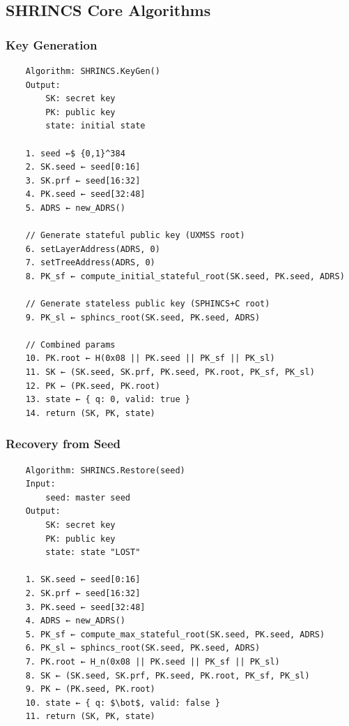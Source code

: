 \subsection{SHRINCS Core Algorithms}

\subsubsection{Key Generation}

\begin{verbatim}
    Algorithm: SHRINCS.KeyGen()
    Output:
        SK: secret key
        PK: public key  
        state: initial state

    1. seed ←$ {0,1}^384
    2. SK.seed ← seed[0:16]
    3. SK.prf ← seed[16:32]
    4. PK.seed ← seed[32:48]
    5. ADRS ← new_ADRS()

    // Generate stateful public key (UXMSS root)
    6. setLayerAddress(ADRS, 0)
    7. setTreeAddress(ADRS, 0)
    8. PK_sf ← compute_initial_stateful_root(SK.seed, PK.seed, ADRS)

    // Generate stateless public key (SPHINCS+C root)
    9. PK_sl ← sphincs_root(SK.seed, PK.seed, ADRS)

    // Combined params
    10. PK.root ← H(0x08 || PK.seed || PK_sf || PK_sl)
    11. SK ← (SK.seed, SK.prf, PK.seed, PK.root, PK_sf, PK_sl)
    12. PK ← (PK.seed, PK.root)
    13. state ← { q: 0, valid: true }
    14. return (SK, PK, state)
\end{verbatim}

\subsubsection{Recovery from Seed}

\begin{verbatim}
    Algorithm: SHRINCS.Restore(seed)
    Input:
        seed: master seed
    Output:
        SK: secret key
        PK: public key
        state: state "LOST"

    1. SK.seed ← seed[0:16]
    2. SK.prf ← seed[16:32]
    3. PK.seed ← seed[32:48]
    4. ADRS ← new_ADRS()
    5. PK_sf ← compute_max_stateful_root(SK.seed, PK.seed, ADRS)
    6. PK_sl ← sphincs_root(SK.seed, PK.seed, ADRS)
    7. PK.root ← H_n(0x08 || PK.seed || PK_sf || PK_sl)
    8. SK ← (SK.seed, SK.prf, PK.seed, PK.root, PK_sf, PK_sl)
    9. PK ← (PK.seed, PK.root)
    10. state ← { q: $\bot$, valid: false } 
    11. return (SK, PK, state)
\end{verbatim}

